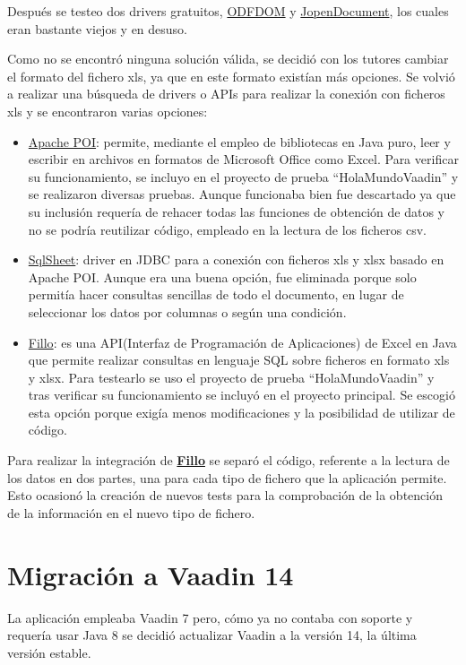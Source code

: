 Después se testeo dos drivers gratuitos, \href{https://odftoolkit.org/}{ODFDOM} y \href{http://www.jopendocument.org/}{JopenDocument}, los cuales eran bastante viejos y en desuso.

Como no se encontró ninguna solución válida, se decidió con los tutores cambiar el formato del fichero xls, ya que en este formato existían más opciones. Se volvió a realizar una búsqueda de drivers o APIs para realizar la conexión con ficheros xls y se encontraron varias opciones: 
\begin{itemize}
	\item \href{https://poi.apache.org/}{Apache POI}: permite, mediante el empleo de bibliotecas en Java puro, leer y escribir en archivos en formatos de Microsoft Office como Excel. Para verificar su funcionamiento, se incluyo en el proyecto de prueba ``HolaMundoVaadin'' y se realizaron diversas pruebas. Aunque funcionaba bien fue descartado ya que su inclusión requería de rehacer todas las funciones de obtención de datos y no se podría reutilizar código, empleado en la lectura de los ficheros csv.
	\item \href{https://code.google.com/archive/p/sqlsheet/}{SqlSheet}: driver en JDBC para a conexión con ficheros xls y xlsx basado en Apache POI. Aunque era una buena opción, fue eliminada porque solo permitía hacer consultas sencillas de todo el documento, en lugar de seleccionar los datos por columnas o según una condición. 
	\item \href{https://codoid.com/fillo/}{Fillo}: es una API(Interfaz de Programación de Aplicaciones) de Excel en Java que permite realizar consultas en lenguaje SQL sobre ficheros en formato xls y xlsx. Para testearlo se uso el proyecto de prueba ``HolaMundoVaadin'' y tras verificar su funcionamiento se incluyó en el proyecto principal. Se escogió esta opción porque exigía menos modificaciones y la posibilidad de utilizar de código.
\end{itemize}

Para realizar la integración de \textbf{\href{https://codoid.com/fillo/}{Fillo}} se separó el código, referente a la lectura de los datos en dos partes, una para cada tipo de fichero que la aplicación permite. Esto ocasionó la creación de nuevos tests para la comprobación de la obtención de la información en el nuevo tipo de fichero.

\section{Migración a Vaadin 14}
La aplicación empleaba Vaadin 7 pero, cómo ya no contaba con soporte y requería usar Java 8 se decidió actualizar Vaadin a la versión 14, la última versión estable.  

